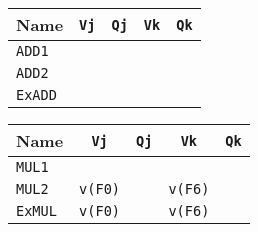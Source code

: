\begin{enumerate}
    \begin{minipage}[t]{0.43\textwidth}
        \centering
        \begin{tabular}{@{} l | c c c c @{}}
            \toprule
            Name            & \texttt{Vj}           & \texttt{Qj}                       & \texttt{Vk}           & \texttt{Qk}           \\
            \midrule
            \texttt{ADD1}   &                       &                                   &                       &                       \\ [.3em]
            \texttt{ADD2}   &                       &                                   &                       &                       \\
            \cmidrule{1-5}
            \texttt{ExADD}  &                       &                                   &                       &                       \\
            \bottomrule
        \end{tabular}
    \end{minipage}
    \hfill
    \begin{minipage}[t]{0.43\textwidth}
        \centering
            \begin{tabular}{@{} l | c c c c @{}}
                \toprule
                Name            & \texttt{Vj}           & \texttt{Qj}           & \texttt{Vk}           & \texttt{Qk}   \\
                \midrule
                \texttt{MUL1}   &                       &                       &                       &               \\ [.3em]
                \texttt{MUL2}   & \texttt{v(F0)}        &                       & \texttt{v(F6)}        &               \\
                \cmidrule{1-5}
                \texttt{ExMUL}  & \texttt{v(F0)}        &                       & \texttt{v(F6)}        &               \\
                \bottomrule
            \end{tabular}
    \end{minipage}


\end{enumerate}
